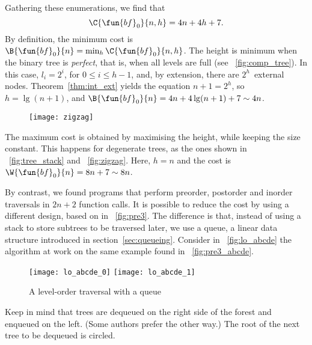 Gathering these enumerations, we find that
\begin{equation*}
\C{\fun{bf}_0}{n,h} = 4n + 4h + 7. \index{bf0@$\C{\fun{bf}_0}{n,h}$}
\end{equation*}
By definition, the minimum cost is \(\B{\fun{bf}_0}{n} =
\min_h\C{\fun{bf}_0}{n,h}\). The height is
minimum when the binary tree is \emph{perfect}, that is, when all levels are full (see
\fig~\vref{fig:comp_tree}). In this case, \(l_i=2^i\), for \(0
\leqslant i \leqslant h-1\), and, by extension, there are
\(2^h\)~external nodes. Theorem~\vref{thm:int_ext} yields the equation
\(n+1 = 2^h\), so \(h=\lg(n+1)\), and \(\B{\fun{bf}_0}{n} = 4n +
4\lg(n+1) + 7 \sim 4n\). 

%
\begin{wrapfigure}[8]{r}[0pt]{0pt}
\centering
\texttt{[image: zigzag]} %
\caption{}
\label{fig:zigzag}
\end{wrapfigure}
The maximum cost is obtained by maximising the height, while keeping the size constant. This happens for
degenerate  trees, as the ones
shown in \fig~\vref{fig:tree_stack} and \fig~\vref{fig:zigzag}. Here,
\(h=n\) and the cost is \(\W{\fun{bf}_0}{n} = 8n + 7 \sim
8n\). 

By contrast, we found programs that perform preorder, postorder and
inorder traversals in \(2n+2\) function calls. It is possible to
reduce the cost by using a different design, based on
 in
\fig~\vref{fig:pre3}. The difference is that, instead of using a stack
to store subtrees to be traversed later, we use a queue,
a linear data structure introduced in
section~\ref{sec:queueing}. Consider in \fig~\vref{fig:lo_abcde} the
algorithm at work on the same example found in
\fig~\vref{fig:pre3_abcde}.
\begin{figure}[b]
\centering
\texttt{[image: lo\_abcde\_0]}
\bigskip
\texttt{[image: lo\_abcde\_1]}
\caption{A level-order traversal with a queue}
\label{fig:lo_abcde}
\end{figure}
Keep in mind that trees are dequeued on the right side of the forest
and enqueued on the left. (Some authors prefer the other way.) The
root of the next tree to be dequeued is circled.

